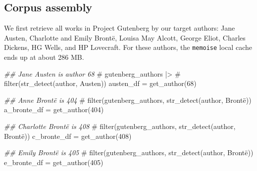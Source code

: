\documentclass[
]{article}
\newenvironment{Shaded}{\begin{snugshade}}{\end{snugshade}}
\newcommand{\CommentTok}[1]{\textcolor[rgb]{0.37,0.37,0.37}{#1}}
\newcommand{\DecValTok}[1]{\textcolor[rgb]{0.68,0.00,0.00}{#1}}
\newcommand{\DocumentationTok}[1]{\textcolor[rgb]{0.37,0.37,0.37}{\textit{#1}}}
\newcommand{\FunctionTok}[1]{\textcolor[rgb]{0.28,0.35,0.67}{#1}}
\newcommand{\NormalTok}[1]{\textcolor[rgb]{0.00,0.23,0.31}{#1}}
\newcommand{\OtherTok}[1]{\textcolor[rgb]{0.00,0.23,0.31}{#1}}
\begin{document}
\hypertarget{corpus-assembly}{%
\subsection{Corpus assembly}\label{corpus-assembly}}

We first retrieve all works in Project Gutenberg by our target authors:
Jane Austen, Charlotte and Emily Brontë, Louisa May Alcott, George
Eliot, Charles Dickens, HG Wells, and HP Lovecraft. For these authors,
the \texttt{memoise} local cache ends up at about 286 MB.

\begin{Shaded}
\begin{Highlighting}[]
\DocumentationTok{\#\# Jane Austen is author 68}
\CommentTok{\# gutenberg\_authors |\textgreater{} }
\CommentTok{\#     filter(str\_detect(author, \textquotesingle{}Austen\textquotesingle{}))}
\NormalTok{austen\_df }\OtherTok{=} \FunctionTok{get\_author}\NormalTok{(}\DecValTok{68}\NormalTok{)}
\end{Highlighting}
\end{Shaded}

\begin{Shaded}
\begin{Highlighting}[]
\DocumentationTok{\#\# Anne Brontë is 404}
\CommentTok{\# filter(gutenberg\_authors, str\_detect(author, \textquotesingle{}Brontë\textquotesingle{}))}
\NormalTok{a\_bronte\_df }\OtherTok{=} \FunctionTok{get\_author}\NormalTok{(}\DecValTok{404}\NormalTok{)}
\end{Highlighting}
\end{Shaded}

\begin{Shaded}
\begin{Highlighting}[]
\DocumentationTok{\#\# Charlotte Brontë is 408}
\CommentTok{\# filter(gutenberg\_authors, str\_detect(author, \textquotesingle{}Brontë\textquotesingle{}))}
\NormalTok{c\_bronte\_df }\OtherTok{=} \FunctionTok{get\_author}\NormalTok{(}\DecValTok{408}\NormalTok{)}
\end{Highlighting}
\end{Shaded}

\begin{Shaded}
\begin{Highlighting}[]
\DocumentationTok{\#\# Emily Brontë is 405}
\CommentTok{\# filter(gutenberg\_authors, str\_detect(author, \textquotesingle{}Brontë\textquotesingle{}))}
\NormalTok{e\_bronte\_df }\OtherTok{=} \FunctionTok{get\_author}\NormalTok{(}\DecValTok{405}\NormalTok{)}
\end{Highlighting}
\end{Shaded}
\end{document}
